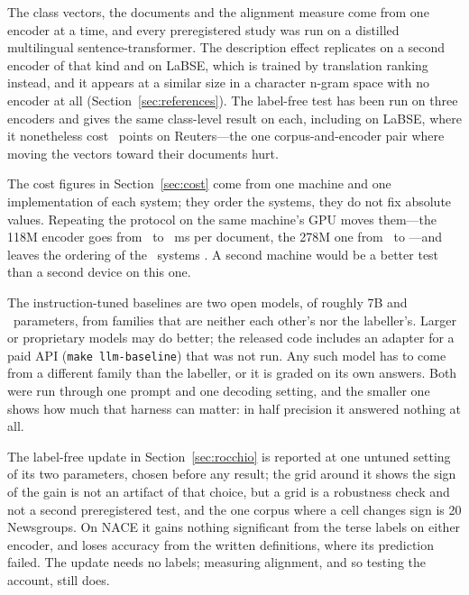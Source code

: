 \documentclass[11pt]{article}
\begin{document}
The class vectors, the documents and the alignment measure come from one
encoder at a time, and every preregistered study was run on a distilled
multilingual sentence-transformer. The description effect replicates on a
second encoder of that kind and on LaBSE, which is trained by translation
ranking instead, and it appears at a similar size in a character n-gram space
with no encoder at all (Section~\ref{sec:references}). The label-free test has
been run on three encoders and gives the same class-level result on each,
including on LaBSE, where it nonetheless cost \RocchioLabseReutersGain~points on
Reuters---the one corpus-and-encoder pair where moving the vectors toward their
documents hurt.

The cost figures in Section~\ref{sec:cost} come from one machine and one
implementation of each system; they order the systems, they do not fix absolute
values. Repeating the protocol on the same machine's GPU moves them---the
118M encoder goes from \BenchMiniLMMs\ to \BenchOtherMiniLMMs~ms per document,
the 278M one from \BenchMpnetMs\ to \BenchOtherMpnetMs---and leaves the
ordering of the \BenchOtherSystems\ systems \BenchOrderingHolds. A second
machine would be a better test than a second device on this one.

The instruction-tuned baselines are two open models, of roughly 7B and
\LLMTwoParams\ parameters, from families that are neither each other's nor the
labeller's. Larger or proprietary models may do better; the released code
includes an adapter for a paid API (\texttt{make llm-baseline}) that was not
run. Any such model has to come from a different family than the labeller, or it
is graded on its own answers. Both were run through one prompt and one decoding
setting, and the smaller one shows how much that harness can matter: in half
precision it answered nothing at all.

The label-free update in Section~\ref{sec:rocchio} is reported at one untuned
setting of its two parameters, chosen before any result; the grid around it
shows the sign of the gain is not an artifact of that choice, but a grid is a
robustness check and not a second preregistered test, and the one corpus where a
cell changes sign is 20 Newsgroups. On NACE it gains nothing significant from the terse labels
on either encoder, and loses accuracy from the written definitions, where its
prediction failed.
The update needs no labels; measuring alignment, and so testing the account, still does.
\end{document}
